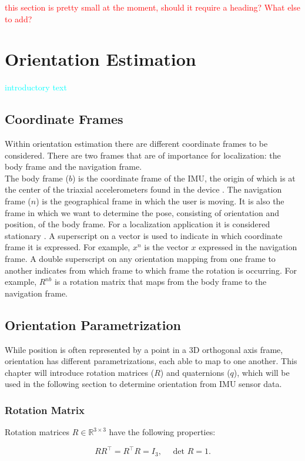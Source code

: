 \textcolor{red}{this section is pretty small at the moment, should it require a heading? What else to add?}

\section{Orientation Estimation}
\textcolor{cyan}{introductory text}
\subsection{Coordinate Frames}
Within orientation estimation there are  different coordinate frames to be considered. There are two frames that are of importance for localization: the body frame and the navigation frame.\\
The body frame ($b$) is the coordinate frame of the IMU, the origin of which is at the center of the triaxial accelerometers found in the device \cite{Kok2017}. The navigation frame ($n$) is the geographical frame in which the user is moving. It is also the frame in which we want to determine the pose, consisting of orientation and position, of the body frame. For a localization application it is considered stationary \cite{Kok2017}.
A superscript on a vector is used to indicate in which coordinate frame it is expressed. For example,
$x^n$ is the vector $x$ expressed in the navigation frame. A double superscript on any orientation mapping from one frame to another indicates from which frame to which frame the rotation is occurring. For example,
$R^{nb}$ is a rotation matrix that maps from the body frame to the navigation frame.


\subsection{Orientation Parametrization}
While position is often represented by a point in a 3D orthogonal axis frame, orientation has different parametrizations, each able to map to one another. This chapter will introduce rotation matrices ($R$) and quaternions ($q$), which will be used in the following section to determine orientation from IMU sensor data.

\subsubsection{Rotation Matrix}
Rotation matrices $R \in \mathbb{R}^{3 \times 3}$ have the following properties:

\begin{equation}
	\label{eq:rot_mat_properties}
	R R^{\top}=R^{\top} R=I_{3}, \quad \text { det } R=1.
\end{equation}

